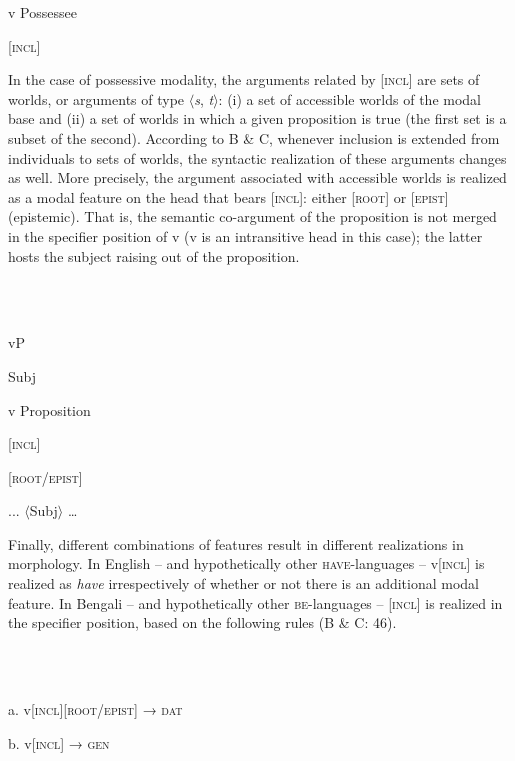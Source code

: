 \documentclass[output=paper,colorlinks,citecolor=brown]{./langscibook}
\begin{document}
      v   Possessee 

    [\textsc{incl}]

In the case of possessive modality, the arguments related by [\textsc{incl]} are sets of worlds, or arguments of type ${\langle}$\textit{s}, \textit{t}${\rangle}$: (i) a set of accessible worlds of the modal base and (ii) a set of worlds in which a given proposition is true (the first set is a subset of the second). According to B \& C, whenever inclusion is extended from individuals to sets of worlds, the syntactic realization of these arguments changes as well. More precisely, the argument associated with accessible worlds is realized as a modal feature on the head that bears [\textsc{incl}]: either [\textsc{root}] or [\textsc{epist}] (epistemic). That is, the semantic co-argument of the proposition is not merged in the specifier position of v (v is an intransitive head in this case); the latter hosts the subject raising out of the proposition.

\ea%
    \label{ex:tsedryk:4}
    \gll\\
        \\
    \glt
    \z

            vP  

  

  Subj

  v   Proposition

    [\textsc{incl}]

    \textsc{[root/epist]}  

  ... \textsc{${\langle}$}Subj${\rangle}$ …

Finally, different combinations of features result in different realizations in morphology. In English – and hypothetically other \textsc{have}{}-languages – v[\textsc{incl}] is realized as \textit{have} irrespectively of whether or not there is an additional modal feature. In Bengali – and hypothetically other \textsc{be}{}-languages – [\textsc{incl}] is realized in the specifier position, based on the following rules (B \& C: 46).

\ea%
    \label{ex:tsedryk:5}
    \gll\\
        \\
    \glt
    \z

          a.  v\textsc{[incl][root/epist]} → \textsc{dat}

  b.  v\textsc{[incl]} → \textsc{gen}       
\end{document}
